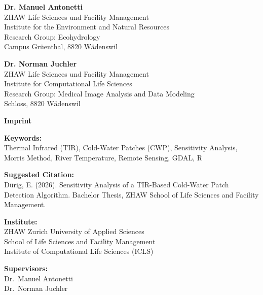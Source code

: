 \begin{titlepage}
\begin{center}
\end{center}

\vfill %


\large \textbf{Dr. Manuel Antonetti}\\
\large ZHAW Life Sciences und Facility Management\\
Institute for the Environment and Natural Resources\\
Research Group: Ecohydrology \\
Campus Grüenthal, 8820 Wädenswil

\large \textbf{Dr. Norman Juchler} \\
\large ZHAW Life Sciences und Facility Management\\
Institute for Computational Life Sciences\\
Research Group: Medical Image Analysis and Data Modeling\\
Schloss, 8820 Wädenswil
	
\end{titlepage}

\newpage
\thispagestyle{empty}
\vspace*{\fill}

\noindent\textbf{Imprint}

\vspace{1em}

\noindent\textbf{Keywords:}\\
Thermal Infrared (TIR), Cold-Water Patches (CWP), Sensitivity Analysis, Morris Method, River Temperature, Remote Sensing, GDAL, R

\vspace{1em}

\noindent\textbf{Suggested Citation:}\\
Dürig, E. (2026). Sensitivity Analysis of a TIR-Based Cold-Water Patch Detection Algorithm. Bachelor Thesis, ZHAW School of Life Sciences and Facility Management.

\vspace{1em}

\noindent\textbf{Institute:}\\
ZHAW Zurich University of Applied Sciences\\
School of Life Sciences and Facility Management\\
Institute of Computational Life Sciences (ICLS)

\vspace{1em}

\noindent\textbf{Supervisors:}\\
Dr.\ Manuel Antonetti\\
Dr.\ Norman Juchler

\newpage